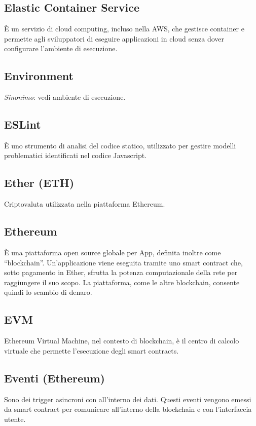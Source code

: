 \section{}
	\subsection*{Elastic Container Service}
	È un servizio di cloud computing, incluso nella AWS, che gestisce container e permette agli sviluppatori di eseguire applicazioni in cloud senza dover configurare l’ambiente di esecuzione. 
	\subsection*{Environment}
	\emph{Sinonimo}: vedi ambiente di esecuzione.
	\subsection*{ESLint}
	È uno strumento di analisi del codice statico, utilizzato per gestire modelli problematici identificati nel codice Javascript.
	\subsection*{Ether (ETH)}
	Criptovaluta utilizzata nella piattaforma Ethereum.
	\subsection*{Ethereum}
	È una piattaforma open source globale per \DJ{}App, definita inoltre come “blockchain”. Un’applicazione viene eseguita tramite uno smart contract che, sotto pagamento in Ether, sfrutta la potenza computazionale della rete per raggiungere il suo scopo. La piattaforma, come le altre blockchain, consente quindi lo scambio di denaro.
	\subsection*{EVM}
	Ethereum Virtual Machine, nel contesto di blockchain, è il centro di calcolo virtuale che permette l’esecuzione degli smart contracts.
	\subsection*{Eventi (Ethereum)}
	Sono dei trigger asincroni con all’interno dei dati. Questi eventi vengono emessi da smart contract per comunicare all’interno della blockchain e con l’interfaccia utente.
